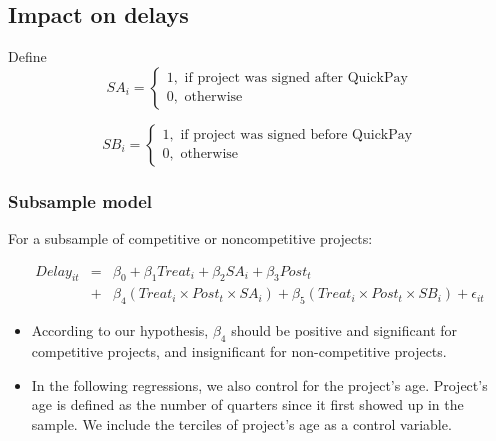 \documentclass[
]{article}
\providecommand{\tightlist}{%
  \setlength{\itemsep}{0pt}\setlength{\parskip}{0pt}}
\begin{document}
\hypertarget{impact-on-delays}{%
\subsection{Impact on delays}\label{impact-on-delays}}

Define
\[ SA_i = \begin{cases} 1, \text{ if project was signed after QuickPay}\\
0, \text{ otherwise} \end{cases}\]

\[ SB_i = \begin{cases} 1, \text{ if project was signed before QuickPay}\\
0, \text{ otherwise} \end{cases}\]

\hypertarget{subsample-model}{%
\subsubsection{Subsample model}\label{subsample-model}}

For a subsample of competitive or noncompetitive projects:

\[ \begin{aligned} Delay_{it} &=& \beta_0 +\beta_1 Treat_i+ \beta_2 SA_i+ \beta_3 Post_t \\&+& \beta_4 (Treat_i \times Post_t \times SA_i )+\beta_5 (Treat_i \times Post_t \times SB_i )+\epsilon_{it} \end{aligned} \]

\begin{itemize}
\tightlist
\item
  According to our hypothesis, \(\beta_4\) should be positive and
  significant for competitive projects, and insignificant for
  non-competitive projects.
\item
  In the following regressions, we also control for the project's age.
  Project's age is defined as the number of quarters since it first
  showed up in the sample. We include the terciles of project's age as a
  control variable.
\end{itemize}
\end{document}

